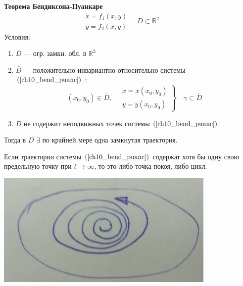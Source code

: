 	\begin{theorem} \textbf{Теорема Бендиксона-Пуанкаре \vspace{5mm}} \newline
			\begin{equation}
				\begin{gathered}
						\dot{x} = f_1(x,y) \\
						\dot{y} =f_2(x,y)
				\end{gathered} \quad \bar{D} \subset \mathbb{R}^2 \ \label{ch10_bend_puanc} \qquad 
			\end{equation}
			Условия:
			\begin{enumerate}
				\item $\bar{D}$ --- огр. замкн. обл. в $\mathbb{R}^2$
				\item $\bar{D}$ --- положительно инвариантно относительно системы $(\ref{ch10_bend_puanc})$ :
					$$
						(x_0, y_0) \in \bar{D}, \quad \left. \begin{gathered}
																				x = x(x_0,y_0) \\
																				y = y(x_0,y_0)
																			\end{gathered} \right\} \quad \gamma \subset \bar{D}
					$$
				\item $\bar{D}$ не содержит неподвижных точек системы $(\ref{ch10_bend_puanc})$.
			\end{enumerate}
			Тогда в $D$ $\exists$ по крайней мере одна замкнутая траектория. 	
	\end{theorem}
	
	\begin{minipage}{0.6\textwidth}
		\begin{lemma}
			Если траектории системы $(\ref{ch10_bend_puanc})$ содержат хотя бы одну свою предельную точку
			при $t\rightarrow\infty$, то это либо точка покоя, либо цикл.
		\end{lemma} 
	\end{minipage}
	\hfill
	\begin{minipage}{0.3\textwidth}
		\begin{center} \includegraphics[width=0.8\textwidth]{ch8/pict/pict_8.png} \vspace{5mm}\end{center} 
	\end{minipage}

